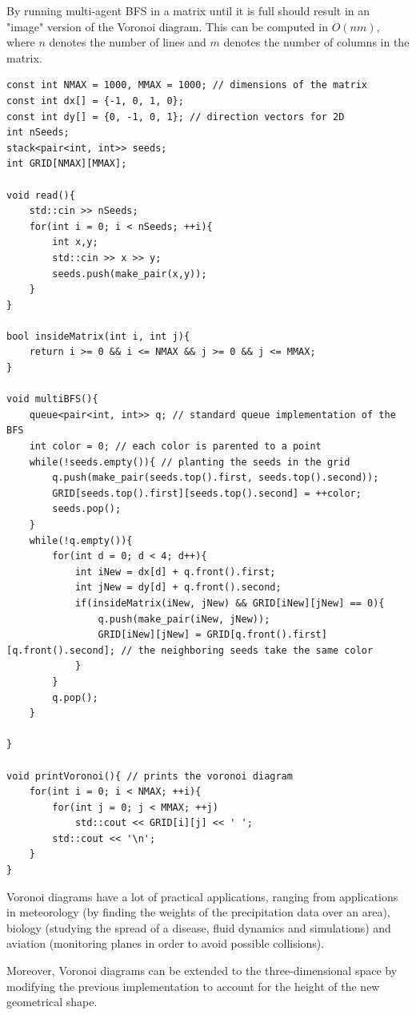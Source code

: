 \documentclass[letterpaper]{article}
\begin{document}
By running multi-agent BFS in a matrix until it is full should result in an "image" version of the Voronoi diagram. This can be computed in $O(nm)$, where $n$ denotes the number of lines and $m$ denotes the number of columns in the matrix.

\begin{lstlisting}
const int NMAX = 1000, MMAX = 1000; // dimensions of the matrix
const int dx[] = {-1, 0, 1, 0};
const int dy[] = {0, -1, 0, 1}; // direction vectors for 2D
int nSeeds;
stack<pair<int, int>> seeds;
int GRID[NMAX][MMAX];

void read(){
    std::cin >> nSeeds;
    for(int i = 0; i < nSeeds; ++i){
        int x,y;
        std::cin >> x >> y;
        seeds.push(make_pair(x,y));
    }
}

bool insideMatrix(int i, int j){
    return i >= 0 && i <= NMAX && j >= 0 && j <= MMAX;
}

void multiBFS(){
    queue<pair<int, int>> q; // standard queue implementation of the BFS
    int color = 0; // each color is parented to a point
    while(!seeds.empty()){ // planting the seeds in the grid
        q.push(make_pair(seeds.top().first, seeds.top().second));
        GRID[seeds.top().first][seeds.top().second] = ++color;
        seeds.pop(); 
    }
    while(!q.empty()){
        for(int d = 0; d < 4; d++){
            int iNew = dx[d] + q.front().first;
            int jNew = dy[d] + q.front().second;
            if(insideMatrix(iNew, jNew) && GRID[iNew][jNew] == 0){
                q.push(make_pair(iNew, jNew));
                GRID[iNew][jNew] = GRID[q.front().first][q.front().second]; // the neighboring seeds take the same color 
            }
        }
        q.pop();
    }

}

void printVoronoi(){ // prints the voronoi diagram
    for(int i = 0; i < NMAX; ++i){
        for(int j = 0; j < MMAX; ++j)
            std::cout << GRID[i][j] << ' ';
        std::cout << '\n';
    }
}
\end{lstlisting}

Voronoi diagrams have a lot of practical applications, ranging from applications in meteorology (by finding the weights of the precipitation data over an area), biology (studying the spread of a disease, fluid dynamics and simulations) and aviation (monitoring planes in order to avoid possible collisions).

Moreover, Voronoi diagrams can be extended to the three-dimensional space by modifying the previous implementation to account for the height of the new geometrical shape.
\end{document}
